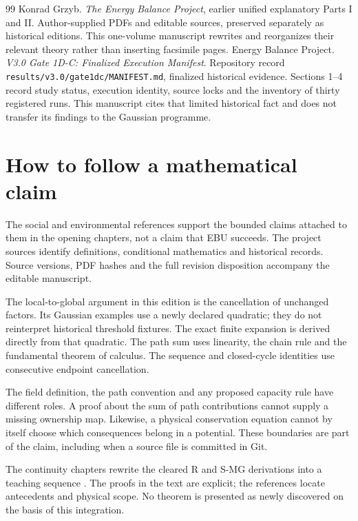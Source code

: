 \begin{thebibliography}{99}
 Konrad Grzyb. \emph{The Energy Balance Project}, earlier unified explanatory Parts I and II. Author-supplied PDFs and editable sources, preserved separately as historical editions. This one-volume manuscript rewrites and reorganizes their relevant theory rather than inserting facsimile pages.
 Energy Balance Project. \emph{V3.0 Gate 1D-C: Finalized Execution Manifest}. Repository record \texttt{results/v3.0/gate1dc/MANIFEST.md}, finalized historical evidence. Sections 1--4 record study status, execution identity, source locks and the inventory of thirty registered runs. This manuscript cites that limited historical fact and does not transfer its findings to the Gaussian programme.

\end{thebibliography}

\section*{How to follow a mathematical claim}
The social and environmental references support the bounded claims attached to
them in the opening chapters, not a claim that EBU succeeds. The project
sources identify definitions, conditional mathematics and historical records.
Source versions, PDF hashes and the full revision disposition accompany the
editable manuscript.

The local-to-global argument in this edition is the cancellation of unchanged
factors. Its Gaussian examples use a newly declared quadratic; they do not
reinterpret historical threshold fixtures. The exact finite expansion is
derived directly from that quadratic. The path sum uses linearity, the chain
rule and the fundamental theorem of calculus. The sequence and closed-cycle
identities use consecutive endpoint cancellation.

The field definition, the path convention and any proposed capacity rule have
different roles. A proof about the sum of path contributions cannot supply a
missing ownership map. Likewise, a physical conservation equation cannot by
itself choose which consequences belong in a potential. These boundaries are
part of the claim, including when a source file is committed in Git.

The continuity chapters rewrite the cleared R and S-MG derivations into a teaching sequence \cite{rstage,smg,smg-prior}. The proofs in the text are explicit; the references locate antecedents and physical scope. No theorem is presented as newly discovered on the basis of this integration.
